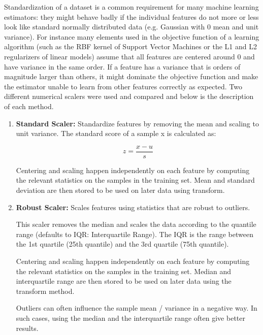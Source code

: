 \documentclass{article}
\theoremstyle{mytheoremstyle}
\theoremstyle{mytheoremstyle}
\theoremstyle{myproblemstyle}
\begin{document}
Standardization of a dataset is a common requirement for many machine learning estimators: they might behave badly if the individual features do not more or less look like standard normally distributed data (e.g. Gaussian with 0 mean and unit variance). For instance many elements used in the objective function of a learning algorithm (such as the RBF kernel of Support Vector Machines or the L1 and L2 regularizers of linear models) assume that all features are centered around 0 and have variance in the same order. If a feature has a variance that is orders of magnitude larger than others, it might dominate the objective function and make the estimator unable to learn from other features correctly as expected.
Two different numerical scalers were used and compared and below is the description of each method. 
\begin{enumerate}
    \item \textbf{Standard Scaler: } Standardize features by removing the mean and scaling to unit variance. The standard score of a sample x is calculated as:
    
    \[z = \frac{x-u}{s}\]
    
Centering and scaling happen independently on each feature by computing the relevant statistics on the samples in the training set. Mean and standard deviation are then stored to be used on later data using transform.


    \item \textbf{Robust Scaler: } Scales features using statistics that are robust to outliers.

    This scaler removes the median and scales the data according to the quantile range (defaults to IQR: Interquartile Range). The IQR is the range between the 1st quartile (25th quantile) and the 3rd quartile (75th quantile).
    
    Centering and scaling happen independently on each feature by computing the relevant statistics on the samples in the training set. Median and interquartile range are then stored to be used on later data using the transform method.
    
   Outliers can often influence the sample mean / variance in a negative way. In such cases, using the median and the interquartile range often give better results.
\end{enumerate}
\end{document}
